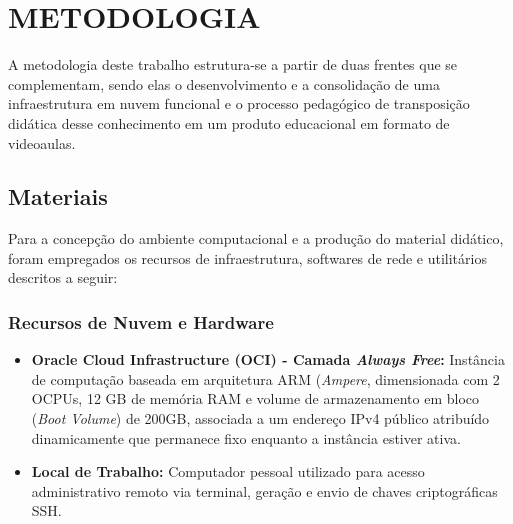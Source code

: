 \chapter{METODOLOGIA}
\label{capitulo-metodologia}
    A metodologia deste trabalho estrutura-se a partir de duas frentes que se complementam, sendo elas o desenvolvimento e a consolidação de uma infraestrutura em nuvem funcional e o processo pedagógico de transposição didática desse conhecimento em um produto educacional em formato de videoaulas.

	\section{Materiais}
    Para a concepção do ambiente computacional e a produção do material didático, foram empregados os recursos de infraestrutura, softwares de rede e utilitários descritos a seguir:

\subsection{Recursos de Nuvem e Hardware}
\begin{itemize}
    \item \textbf{Oracle Cloud Infrastructure (OCI) - Camada \textit{Always Free}:} Instância de computação baseada em arquitetura ARM (\textit{Ampere}, dimensionada com 2 OCPUs, 12 GB de memória RAM e volume de armazenamento em bloco (\textit{Boot Volume}) de 200GB, associada a um endereço IPv4 público atribuído dinamicamente que permanece fixo enquanto a instância estiver ativa.
    \item \textbf{Local de Trabalho:} Computador pessoal utilizado para acesso administrativo remoto via terminal, geração e envio de chaves criptográficas SSH.
\end{itemize}

